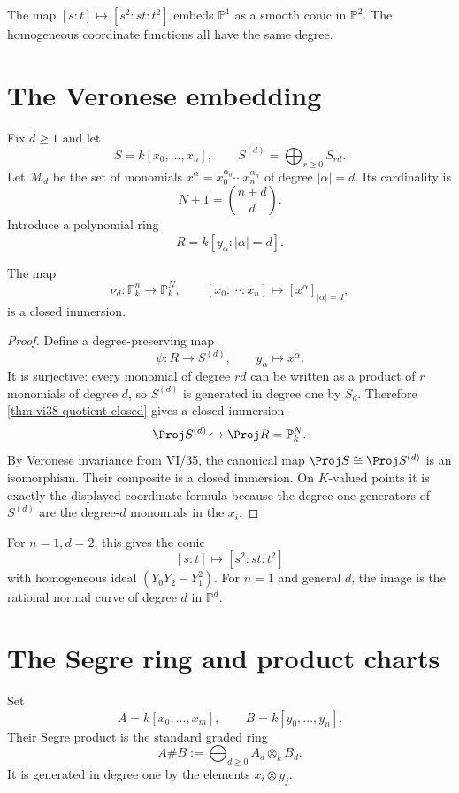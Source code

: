 \begin{example}\label{ex:vi38-expand-02}
The map $[s:t]\mapsto[s^2:st:t^2]$ embeds $\mathbb P^1$ as a smooth conic in $\mathbb P^2$.  The homogeneous coordinate functions all have the same degree.
\end{example}
\section{The Veronese embedding}
Fix \(d\ge1\) and let
\[
  S=k[x_0,\ldots,x_n],
  \qquad
  S^{(d)}=\bigoplus_{r\ge0}S_{rd}.
\]
Let \(\mathcal M_d\) be the set of monomials \(x^\alpha=x_0^{\alpha_0}\cdots x_n^{\alpha_n}\) of degree \(|\alpha|=d\).  Its cardinality is
\[
  N+1=\binom{n+d}{d}.
\]
Introduce a polynomial ring
\[
  R=k[y_\alpha:|\alpha|=d].
\]

\begin{theorem}\label{thm:vi38-veronese}
The map
\[
  \nu_d:\mathbb P^n_k\longrightarrow\mathbb P^N_k,
  \qquad
  [x_0:\cdots:x_n]\longmapsto[x^\alpha]_{|\alpha|=d},
\]
is a closed immersion.
\end{theorem}

\begin{proof}
Define a degree-preserving map
\[
  \psi:R\longrightarrow S^{(d)},
  \qquad
  y_\alpha\longmapsto x^\alpha.
\]
It is surjective: every monomial of degree \(rd\) can be written as a product of \(r\) monomials of degree \(d\), so \(S^{(d)}\) is generated in degree one by \(S_d\).  Therefore \cref{thm:vi38-quotient-closed} gives a closed immersion
\[
  \Proj S^{(d)}\hookrightarrow\Proj R=\mathbb P^N_k.
\]
By Veronese invariance from VI/35, the canonical map \(\Proj S\cong\Proj S^{(d)}\) is an isomorphism.  Their composite is a closed immersion.  On \(K\)-valued points it is exactly the displayed coordinate formula because the degree-one generators of \(S^{(d)}\) are the degree-\(d\) monomials in the \(x_i\).
\end{proof}



For \(n=1,d=2\), this gives the conic
\[
  [s:t]\longmapsto[s^2:st:t^2]
\]
with homogeneous ideal \((Y_0Y_2-Y_1^2)\).  For \(n=1\) and general \(d\), the image is the rational normal curve of degree \(d\) in \(\mathbb P^d\).

\section{The Segre ring and product charts}
Set
\[
  A=k[x_0,\ldots,x_m],\qquad B=k[y_0,\ldots,y_n].
\]
Their Segre product is the standard graded ring
\[
  A\# B:=\bigoplus_{d\ge0}A_d\otimes_k B_d.
\]
It is generated in degree one by the elements \(x_i\otimes y_j\).

